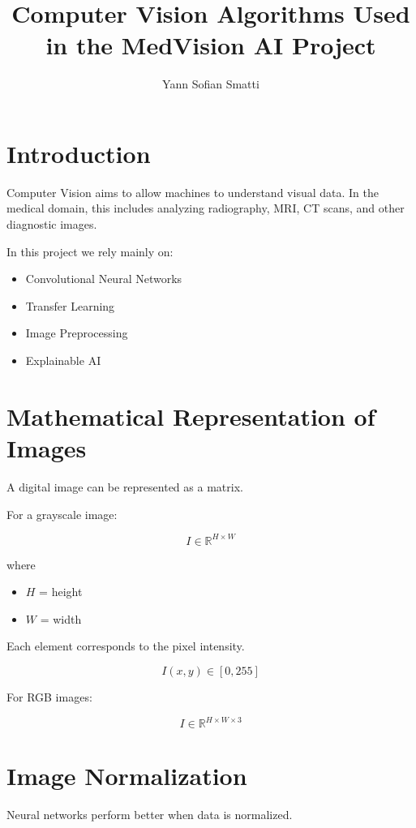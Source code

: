 \documentclass[11pt]{article}
\title{Computer Vision Algorithms Used in the MedVision AI Project}
\author{Yann Sofian Smatti}
\date{}
\begin{document}
\maketitle

\tableofcontents

\newpage

\section{Introduction}

Computer Vision aims to allow machines to understand visual data.
In the medical domain, this includes analyzing radiography, MRI, CT scans,
and other diagnostic images.

In this project we rely mainly on:

\begin{itemize}
\item Convolutional Neural Networks
\item Transfer Learning
\item Image Preprocessing
\item Explainable AI
\end{itemize}

\section{Mathematical Representation of Images}

A digital image can be represented as a matrix.

For a grayscale image:

\[
I \in \mathbb{R}^{H \times W}
\]

where

\begin{itemize}
\item $H$ = height
\item $W$ = width
\end{itemize}

Each element corresponds to the pixel intensity.

\[
I(x,y) \in [0,255]
\]

For RGB images:

\[
I \in \mathbb{R}^{H \times W \times 3}
\]

\section{Image Normalization}

Neural networks perform better when data is normalized.
\end{document}
